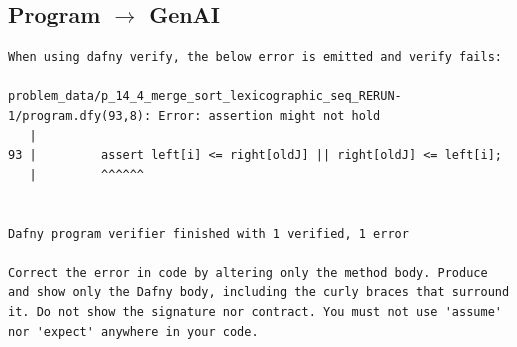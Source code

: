 \documentclass{article}
\begin{document}
\subsection*{Program $\rightarrow$ GenAI}
\begin{lstlisting}
When using dafny verify, the below error is emitted and verify fails:

problem_data/p_14_4_merge_sort_lexicographic_seq_RERUN-1/program.dfy(93,8): Error: assertion might not hold
   |
93 |         assert left[i] <= right[oldJ] || right[oldJ] <= left[i];
   |         ^^^^^^


Dafny program verifier finished with 1 verified, 1 error

Correct the error in code by altering only the method body. Produce and show only the Dafny body, including the curly braces that surround it. Do not show the signature nor contract. You must not use 'assume' nor 'expect' anywhere in your code.
\end{lstlisting}
\end{document}
